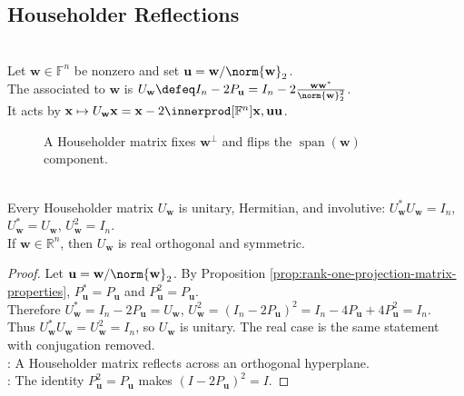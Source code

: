 \subsection{Householder Reflections}

\begin{definition} \label{def:householder-matrix} \\
Let $\mathbf{w}\in\mathbb{F}^n$ be nonzero and set $\mathbf{u}=\mathbf{w}/\norm{\mathbf{w}}_2$.\\
The  associated to $\mathbf{w}$ is $U_{\mathbf{w}}\defeq I_n-2P_{\mathbf{u}}=I_n-2\frac{\mathbf{w}\mathbf{w}^*}{\norm{\mathbf{w}}_2^2}$.\\
It acts by $\mathbf{x}\mapsto U_{\mathbf{w}}\mathbf{x}=\mathbf{x}-2\innerprod[\mathbb{F}^n]{\mathbf{x},\mathbf{u}}\mathbf{u}$.
\end{definition}

\begin{figure}[H]
  \centering
  
  \caption{A Householder matrix fixes $\mathbf{w}^{\perp}$ and flips the $\operatorname{span}(\mathbf{w})$ component.}
  \label{fig:householder-reflection}
\end{figure}

\begin{theorem} \label{thm:householder-matrix-properties} \\
Every Householder matrix $U_{\mathbf{w}}$ is unitary, Hermitian, and involutive: $U_{\mathbf{w}}^*U_{\mathbf{w}}=I_n$, $U_{\mathbf{w}}^*=U_{\mathbf{w}}$, $U_{\mathbf{w}}^2=I_n$.\\
If $\mathbf{w}\in\mathbb{R}^n$, then $U_{\mathbf{w}}$ is real orthogonal and symmetric.
\begin{proof}
Let $\mathbf{u}=\mathbf{w}/\norm{\mathbf{w}}_2$. By Proposition \ref{prop:rank-one-projection-matrix-properties}, $P_{\mathbf{u}}^*=P_{\mathbf{u}}$ and $P_{\mathbf{u}}^2=P_{\mathbf{u}}$.\\
Therefore $U_{\mathbf{w}}^*=I_n-2P_{\mathbf{u}}=U_{\mathbf{w}}$, $U_{\mathbf{w}}^2=(I_n-2P_{\mathbf{u}})^2=I_n-4P_{\mathbf{u}}+4P_{\mathbf{u}}^2=I_n$.\\
Thus $U_{\mathbf{w}}^*U_{\mathbf{w}}=U_{\mathbf{w}}^2=I_n$, so $U_{\mathbf{w}}$ is unitary. The real case is the same statement with conjugation removed.\\
: A Householder matrix reflects across an orthogonal hyperplane.\\
: The identity $P_{\mathbf{u}}^2=P_{\mathbf{u}}$ makes $(I-2P_{\mathbf{u}})^2=I$.
\end{proof}
\end{theorem}

